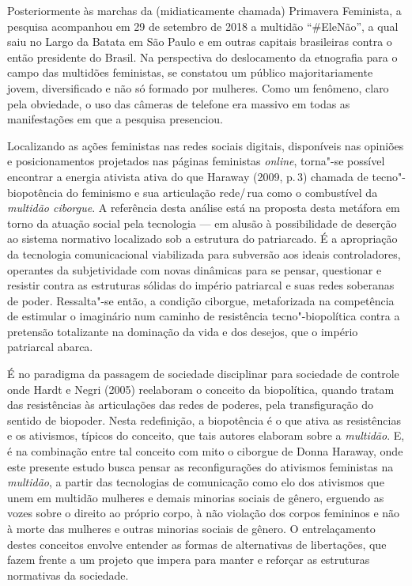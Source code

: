 Posteriormente às marchas da (midiaticamente chamada) Primavera
Feminista, a pesquisa acompanhou em 29 de setembro de 2018 a multidão ``\#EleNão'',
a qual saiu no Largo da Batata em São Paulo e em outras capitais
brasileiras contra o então presidente do Brasil. Na perspectiva do
deslocamento da etnografia para o campo das multidões feministas, se
constatou um público majoritariamente jovem, diversificado e não só
formado por mulheres. Como um fenômeno, claro pela obviedade, o uso das
câmeras de telefone era massivo em todas as manifestações em que a
pesquisa presenciou.

Localizando as ações feministas nas redes sociais digitais, disponíveis
nas opiniões e posicionamentos projetados nas páginas feministas
\textit{online}, torna"-se possível encontrar a energia ativista ativa do que
Haraway (2009, p.\,3) chamada de tecno"-biopotência do feminismo e sua
articulação rede/\,rua como o combustível da \textit{multidão ciborgue}. A
referência desta análise está na proposta desta metáfora em torno da
atuação social pela tecnologia --- em alusão à possibilidade de deserção
ao sistema normativo localizado sob a estrutura do patriarcado. É a
apropriação da tecnologia comunicacional viabilizada para subversão aos
ideais controladores, operantes da subjetividade com novas dinâmicas
para se pensar, questionar e resistir contra as estruturas sólidas do
império patriarcal e suas redes soberanas de poder. Ressalta"-se então, a
condição ciborgue, metaforizada na competência de estimular o imaginário
num caminho de resistência tecno"-biopolítica contra a pretensão
totalizante na dominação da vida e dos desejos, que o império patriarcal
abarca.

É no paradigma da passagem de sociedade disciplinar para sociedade de
controle onde Hardt e Negri (2005) reelaboram o conceito da biopolítica,
quando tratam das resistências às articulações das redes de poderes,
pela transfiguração do sentido de biopoder. Nesta redefinição, a
biopotência é o que ativa as resistências e os ativismos, típicos do
conceito, que tais autores elaboram sobre a \textit{multidão}. E, é na
combinação entre tal conceito com mito o ciborgue de Donna Haraway, onde
este presente estudo busca pensar as reconfigurações do ativismos
feministas na \textit{multidão}, a partir das tecnologias de comunicação como
elo dos ativismos que unem em multidão mulheres e demais minorias
sociais de gênero, erguendo as vozes sobre o direito ao próprio corpo, à
não violação dos corpos femininos e não à morte das mulheres e outras
minorias sociais de gênero. O entrelaçamento destes conceitos envolve
entender as formas de alternativas de libertações, que fazem frente a um
projeto que impera para manter e reforçar as estruturas normativas da
sociedade.

